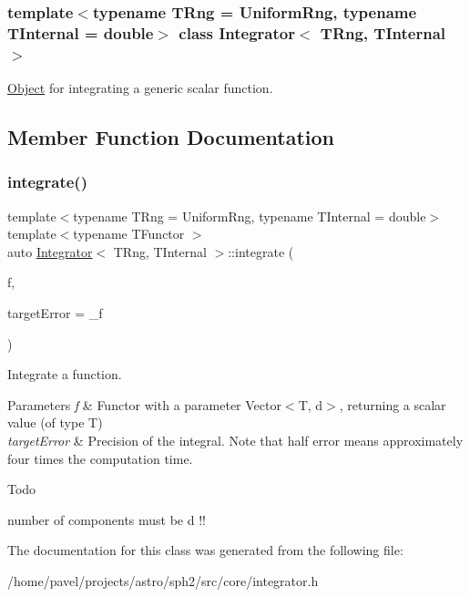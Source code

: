 \subsubsection*{template$<$typename T\+Rng = Uniform\+Rng, typename T\+Internal = double$>$\newline
class Integrator$<$ T\+Rng, T\+Internal $>$}

\hyperlink{classObject}{Object} for integrating a generic scalar function. 

\subsection{Member Function Documentation}
\hypertarget{classIntegrator_adf117e3936f928bccd93ad41567acba8}{}\label{classIntegrator_adf117e3936f928bccd93ad41567acba8} 
\subsubsection{\texorpdfstring{integrate()}{integrate()}}
{\footnotesize\ttfamily template$<$typename T\+Rng  = Uniform\+Rng, typename T\+Internal  = double$>$ \\
template$<$typename T\+Functor $>$ \\
auto \hyperlink{classIntegrator}{Integrator}$<$ T\+Rng, T\+Internal $>$\+::integrate (\begin{DoxyParamCaption}\item[{T\+Functor \&\&}]{f,  }\item[{const Float}]{target\+Error = {\+\_\+f} }\end{DoxyParamCaption})\hspace{0.3cm}{\ttfamily [inline]}}

Integrate a function. 
\begin{DoxyParams}{Parameters}
{\em f} & Functor with a parameter Vector$<$\+T, d$>$, returning a scalar value (of type T) \\
\hline
{\em target\+Error} & Precision of the integral. Note that half error means approximately four times the computation time. \\
\hline
\end{DoxyParams}
\begin{DoxyRefDesc}{Todo}
\item[\hyperlink{todo__todo000003}{Todo}]number of components must be d !! \end{DoxyRefDesc}


The documentation for this class was generated from the following file\+:\begin{DoxyCompactItemize}
\item 
/home/pavel/projects/astro/sph2/src/core/integrator.\+h\end{DoxyCompactItemize}
